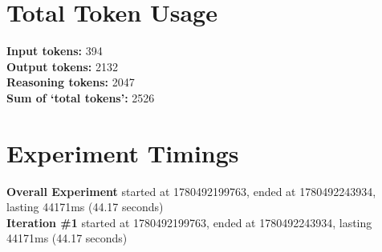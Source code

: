 \documentclass{article}
\begin{document}
\section*{Total Token Usage}
\textbf{Input tokens: }394
\\\textbf{Output tokens: }2132
\\\textbf{Reasoning tokens: }2047
\\\textbf{Sum of `total tokens': }2526
\section*{Experiment Timings}
\textbf{Overall Experiment} started at 1780492199763, ended at 1780492243934, lasting 44171ms (44.17 seconds)
\\\textbf{Iteration \#1} started at 1780492199763, ended at 1780492243934, lasting 44171ms (44.17 seconds)
\end{document}
